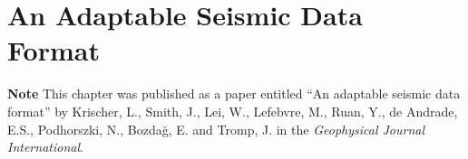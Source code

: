 \chapter{An Adaptable Seismic Data Format\label{ch:asdf}}
\label{chapter:asdf}

\textbf{Note}\newline
This chapter was published as a paper entitled ``An adaptable seismic data format''
by Krischer, L., Smith, J., Lei, W., Lefebvre, M., Ruan, Y., de Andrade, E.S.,
Podhorszki, N., Bozda\u g, E. and Tromp, J. in the
\textit{Geophysical Journal International}.









